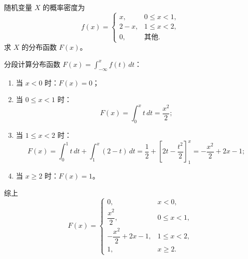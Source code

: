 \documentclass[lang=cn,11pt]{elegantbook}
\begin{document}
\begin{exercise}[分段概率密度的分布函数] \label{exer:2-47}
随机变量 $X$ 的概率密度为
\[
f(x)=
\begin{cases}
x, & 0\leqslant x<1, \\[6pt]
2-x, & 1\leqslant x<2, \\[6pt]
0, & \text{其他}.
\end{cases}
\]
求 $X$ 的分布函数 $F(x)$。
\end{exercise}
\begin{solution}
分段计算分布函数 $F(x) = \int_{-\infty}^{x} f(t)\,dt$：
\begin{enumerate}
    \item 当 $x<0$ 时：$F(x)=0$；
    \item 当 $0\leqslant x<1$ 时：
    \[
    F(x) = \int_0^x t\,dt = \frac{x^2}{2};
    \]
    \item 当 $1\leqslant x<2$ 时：
    \[
    F(x) = \int_0^1 t\,dt + \int_1^x (2-t)\,dt = \frac{1}{2} + \left[2t - \frac{t^2}{2}\right]_1^x = -\frac{x^2}{2} + 2x - 1;
    \]    
    \item 当 $x\geqslant2$ 时：$F(x)=1$。
\end{enumerate}
综上
\[
F(x)=
\begin{cases}
0, & x<0, \\[6pt]
\dfrac{x^2}{2}, & 0\leqslant x<1, \\[6pt]
-\dfrac{x^2}{2}+2x-1, & 1\leqslant x<2, \\[6pt]
1, & x\geqslant2.
\end{cases}
\]
\end{solution}
\end{document}
